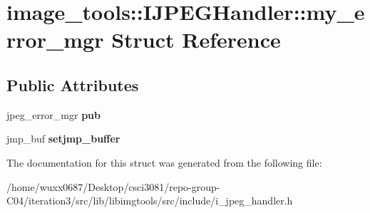 \hypertarget{structimage__tools_1_1IJPEGHandler_1_1my__error__mgr}{}\section{image\+\_\+tools\+:\+:I\+J\+P\+E\+G\+Handler\+:\+:my\+\_\+error\+\_\+mgr Struct Reference}
\label{structimage__tools_1_1IJPEGHandler_1_1my__error__mgr}
\subsection*{Public Attributes}
\begin{DoxyCompactItemize}
\item 
jpeg\+\_\+error\+\_\+mgr {\bfseries pub}\hypertarget{structimage__tools_1_1IJPEGHandler_1_1my__error__mgr_a694c7e412f46360915c5fb04177be3d1}{}\label{structimage__tools_1_1IJPEGHandler_1_1my__error__mgr_a694c7e412f46360915c5fb04177be3d1}

\item 
jmp\+\_\+buf {\bfseries setjmp\+\_\+buffer}\hypertarget{structimage__tools_1_1IJPEGHandler_1_1my__error__mgr_a04d55d4d48759139292dd8ddfdd66b72}{}\label{structimage__tools_1_1IJPEGHandler_1_1my__error__mgr_a04d55d4d48759139292dd8ddfdd66b72}

\end{DoxyCompactItemize}


The documentation for this struct was generated from the following file\+:\begin{DoxyCompactItemize}
\item 
/home/wuxx0687/\+Desktop/csci3081/repo-\/group-\/\+C04/iteration3/src/lib/libimgtools/src/include/i\+\_\+jpeg\+\_\+handler.\+h\end{DoxyCompactItemize}
